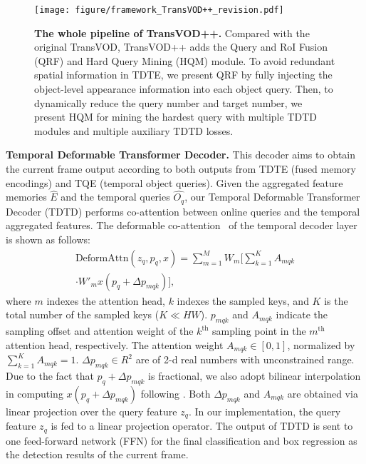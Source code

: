 \documentclass[10pt,journal,compsoc]{IEEEtran}
\begin{document}
\begin{figure*}[h]
    \centering
    \texttt{[image: figure/framework\_TransVOD++\_revision.pdf]}
    \caption{\small \textbf{The whole pipeline of TransVOD++.} Compared with the original TransVOD, TransVOD++ adds the Query and RoI Fusion (QRF) and Hard Query Mining (HQM) module. To avoid redundant spatial information in TDTE, we present QRF by fully injecting the object-level appearance information into each object query. Then, to dynamically reduce the query number and target number, we present HQM for mining the hardest query with multiple TDTD modules and multiple auxiliary TDTD losses. }
    \label{fig:framework_transvod_plus}
    \vspace{-5mm}
\end{figure*}

\noindent
\textbf{Temporal Deformable Transformer Decoder.}
This decoder aims to obtain the current frame output according to both outputs from TDTE (fused memory encodings) and TQE (temporal object queries). Given the aggregated feature memories $\hat{E}$  and the temporal queries $\hat{O_q}$, our Temporal Deformable Transformer Decoder (TDTD) performs co-attention between online queries and the temporal aggregated features.
The deformable co-attention~\cite{zhu2020deformable} of the temporal decoder layer is shown as follows:
\begin{align}
\text{DeformAttn}(z_q, p_q, x) = \sum_{m=1}^{M} W_m \big[\sum_{k=1}^{K} A_{mqk} \nonumber \\
\cdot W'_m x(p_q + \Delta  p_{mqk})\big],
\label{eq:single_deform_attn_fun}
\end{align}
where $m$ indexes the attention head, $k$ indexes the sampled keys, and $K$ is the total number of the sampled keys ($K \ll HW$).
$p_{mqk}$ and $A_{mqk}$ indicate the sampling offset and attention weight of the $k^\text{th}$ sampling point in the $m^\text{th}$ attention head, respectively.
The attention weight $A_{mqk} \in [0, 1]$, normalized by $\sum_{k=1}^{K} A_{mqk} = 1$. $\Delta p_{mqk} \in R^2$ are of 2-d real numbers with unconstrained range. Due to the fact that $p_q + \Delta p_{mqk}$ is fractional, we also adopt bilinear interpolation in computing $x(p_q + \Delta p_{mqk})$ following \cite{dai2017deformable}. 
Both $\Delta p_{mqk}$ and $A_{mqk}$ are obtained via linear projection over the query feature $z_q$. In our implementation, the query feature $z_q$ is fed to a linear projection operator. The output of TDTD is sent to one feed-forward network (FFN) for the final classification and box regression as the detection results of the current frame.
\end{document}
